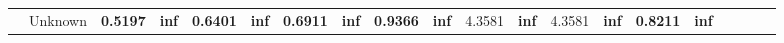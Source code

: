 \begin{table}
\begin{tabular}{llSSSSSSSSSSSSSSSSSS}
		                                       & Unknown      & \bfseries 0.5197                          & \bfseries inf                                                                                                                                                                                                                                                                                                                                                                                                              & \bfseries 0.6401                  & \bfseries inf                                                                                                                                                                                                                                                                                                                                                                                                              & \bfseries 0.6911               & \bfseries inf                                                                                                                                                                                                                                                                                                                                                                                                              & \bfseries 0.9366                   & \bfseries inf                                                                                                                                                                                                                                                                                                                                                                                                              & 4.3581                                                                                                                           & \bfseries inf                                                                                                                                                                                                                                                                                                                                                                                                              & 4.3581            & \bfseries inf                                                                                                                                                                                                                                                                                                                                                                                                              & \bfseries 0.8211 & \bfseries inf                                                                                                                                                                                                                                                                                                                                                                                                              & \bfseries 
\end{tabular}
\end{table}
